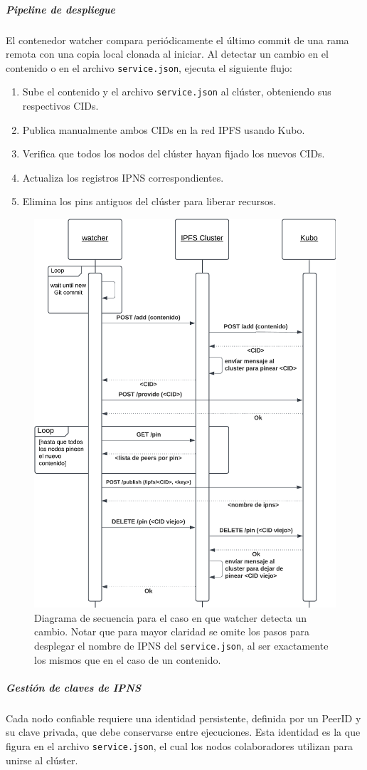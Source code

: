 \subparagraph{Pipeline de despliegue} El contenedor watcher compara periódicamente el último commit de una rama remota con una copia local clonada al iniciar. Al detectar un cambio en el contenido o en el archivo \texttt{service.json}, ejecuta el siguiente flujo:
\begin{enumerate}
    \item Sube el contenido y el archivo \texttt{service.json} al clúster, obteniendo sus respectivos CIDs.
    \item Publica manualmente ambos CIDs en la red IPFS usando Kubo.
    \item Verifica que todos los nodos del clúster hayan fijado los nuevos CIDs.
    \item Actualiza los registros IPNS correspondientes.
    \item Elimina los pins antiguos del clúster para liberar recursos.
\end{enumerate}

\begin{figure}[H]
    \centering
    \includegraphics[width=0.5\linewidth]{img/solucion-ipfs/ds-trusted-peer.png}
    \caption{Diagrama de secuencia para el caso en que watcher detecta un cambio. Notar que para mayor claridad se omite los pasos para desplegar el nombre de IPNS del \texttt{service.json}, al ser exactamente los mismos que en el caso de un contenido.}
    \label{fig:ds-contenedores-trusted-peer}
\end{figure}

\subparagraph{Gestión de claves de IPNS}

Cada nodo confiable requiere una identidad persistente, definida por un PeerID y su clave privada, que debe conservarse entre ejecuciones. Esta identidad es la que figura en el archivo \texttt{service.json}, el cual los nodos colaboradores utilizan para unirse al clúster.

